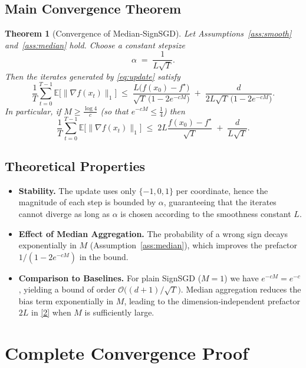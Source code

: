 \documentclass{article}
\newtheorem{theorem}{Theorem}
\newcommand{\E}{\mathbb{E}}
\begin{document}
\subsection*{Main Convergence Theorem}
\begin{theorem}[Convergence of Median‑SignSGD]\label{thm:main}
Let Assumptions~\ref{ass:smooth} and~\ref{ass:median} hold.  
Choose a constant stepsize 
\[
\alpha\;=\;\frac{1}{L\sqrt{T}}.
\]
Then the iterates generated by \eqref{eq:update} satisfy
\[
\frac{1}{T}\sum_{t=0}^{T-1}\E\big[\|\nabla f(x_{t})\|_{1}\big]
\;\le\;
\frac{L\big(f(x_{0})-f^{\star}\big)}{\sqrt{T}\,\big(1-2e^{-cM}\big)}
   \;+\;
\frac{d}{2L\sqrt{T}\,\big(1-2e^{-cM}\big)}.
\tag{1}
\]
In particular, if $M\ge\frac{\log 4}{c}$ (so that $e^{-cM}\le\frac14$) then
\[
\frac{1}{T}\sum_{t=0}^{T-1}\E\big[\|\nabla f(x_{t})\|_{1}\big]
\;\le\;
2L\frac{f(x_{0})-f^{\star}}{\sqrt{T}}
   \;+\;
\frac{d}{L\sqrt{T}}.
\tag{2}
\]
\end{theorem}

\subsection*{Theoretical Properties}
\begin{itemize}[leftmargin=*]
\item \textbf{Stability.} The update uses only $\{-1,0,1\}$ per coordinate,
hence the magnitude of each step is bounded by $\alpha$, guaranteeing that
the iterates cannot diverge as long as $\alpha$ is chosen according to the
smoothness constant $L$.
\item \textbf{Effect of Median Aggregation.} The probability of a wrong sign
decays exponentially in $M$ (Assumption~\ref{ass:median}), which improves the
prefactor $1/(1-2e^{-cM})$ in the bound.
\item \textbf{Comparison to Baselines.} For plain SignSGD ($M=1$) we have
$e^{-cM}=e^{-c}$, yielding a bound of order $\mathcal{O}\!\big((d+1)/\sqrt{T}\big)$.
Median aggregation reduces the bias term exponentially in $M$, leading to the
dimension‑independent prefactor $2L$ in \eqref{2} when $M$ is sufficiently
large.
\end{itemize}

\section*{Complete Convergence Proof}
\end{document}
